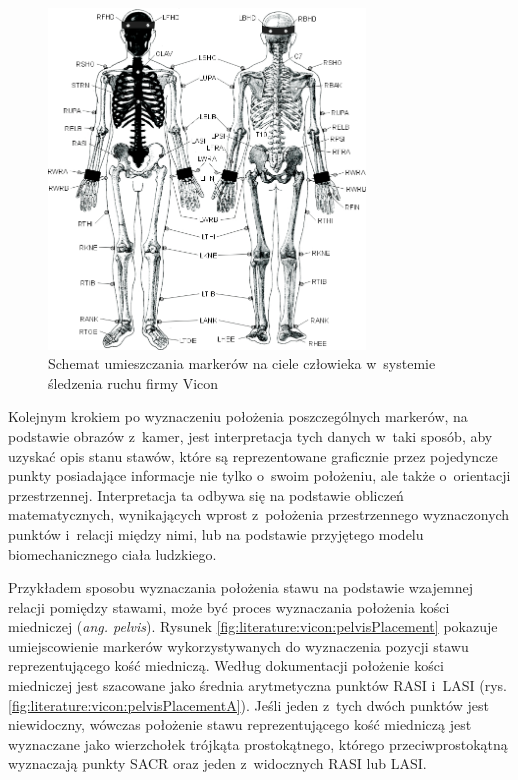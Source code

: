 \begin{savenotes}
	\begin{figure}[!htb]
		\centering	
		\includegraphics[width=0.75\textwidth]{images/markerPlacement.jpg}
		\caption[Rysunek przedstawiający schemat umieszczania markerów na ciele człowieka w~systemie śledzenia ruchu firmy Vicon]{Schemat umieszczania markerów na ciele człowieka w~systemie śledzenia ruchu firmy Vicon \cite{ViconGaitPlacement}}
		\label{fig:literature:vicon:markerPlacement}
	\end{figure}
\end{savenotes}
																			
Kolejnym krokiem po wyznaczeniu położenia poszczególnych markerów, na podstawie obrazów z~kamer, jest interpretacja tych danych w~taki sposób, aby uzyskać opis stanu stawów, które są reprezentowane graficznie przez pojedyncze punkty posiadające informacje nie tylko o~swoim położeniu, ale także o~orientacji przestrzennej. Interpretacja ta odbywa się na podstawie obliczeń matematycznych, wynikających wprost z~położenia przestrzennego wyznaczonych punktów i~relacji między nimi, lub na podstawie przyjętego modelu biomechanicznego ciała ludzkiego. 

Przykładem sposobu wyznaczania położenia stawu na podstawie wzajemnej relacji pomiędzy stawami, może być proces wyznaczania położenia kości miedniczej (\emph{ang. pelvis}). Rysunek \ref{fig:literature:vicon:pelvisPlacement} pokazuje umiejscowienie markerów wykorzystywanych do wyznaczenia pozycji stawu reprezentującego kość miedniczą. Według dokumentacji \cite{ViconModelingInstruction} położenie kości miedniczej jest szacowane jako średnia arytmetyczna punktów RASI i~LASI (rys. \ref{fig:literature:vicon:pelvisPlacementA}). Jeśli jeden z~tych dwóch punktów jest niewidoczny, wówczas położenie stawu reprezentującego kość miedniczą jest wyznaczane jako wierzchołek trójkąta prostokątnego, którego przeciwprostokątną wyznaczają punkty SACR oraz jeden z~widocznych RASI lub LASI.
																	
